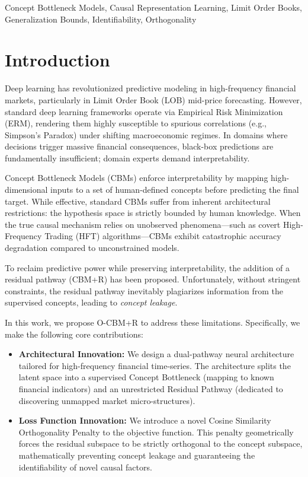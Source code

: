 \documentclass[twoside,11pt]{article}
\begin{document}
\begin{keywords}
  Concept Bottleneck Models, Causal Representation Learning, Limit Order Books, Generalization Bounds, Identifiability, Orthogonality
\end{keywords}

\section{Introduction}
Deep learning has revolutionized predictive modeling in high-frequency financial markets, particularly in Limit Order Book (LOB) mid-price forecasting. However, standard deep learning frameworks operate via Empirical Risk Minimization (ERM), rendering them highly susceptible to spurious correlations (e.g., Simpson's Paradox) under shifting macroeconomic regimes. In domains where decisions trigger massive financial consequences, black-box predictions are fundamentally insufficient; domain experts demand interpretability.

Concept Bottleneck Models (CBMs) enforce interpretability by mapping high-dimensional inputs to a set of human-defined concepts before predicting the final target. While effective, standard CBMs suffer from inherent architectural restrictions: the hypothesis space is strictly bounded by human knowledge. When the true causal mechanism relies on unobserved phenomena—such as covert High-Frequency Trading (HFT) algorithms—CBMs exhibit catastrophic accuracy degradation compared to unconstrained models.

To reclaim predictive power while preserving interpretability, the addition of a residual pathway (CBM+R) has been proposed. Unfortunately, without stringent constraints, the residual pathway inevitably plagiarizes information from the supervised concepts, leading to \textit{concept leakage}. 

In this work, we propose O-CBM+R to address these limitations. Specifically, we make the following core contributions:
\begin{itemize}
    \item \textbf{Architectural Innovation:} We design a dual-pathway neural architecture tailored for high-frequency financial time-series. The architecture splits the latent space into a supervised Concept Bottleneck (mapping to known financial indicators) and an unrestricted Residual Pathway (dedicated to discovering unmapped market micro-structures).
    \item \textbf{Loss Function Innovation:} We introduce a novel Cosine Similarity Orthogonality Penalty to the objective function. This penalty geometrically forces the residual subspace to be strictly orthogonal to the concept subspace, mathematically preventing concept leakage and guaranteeing the identifiability of novel causal factors.
\end{itemize}
\end{document}
